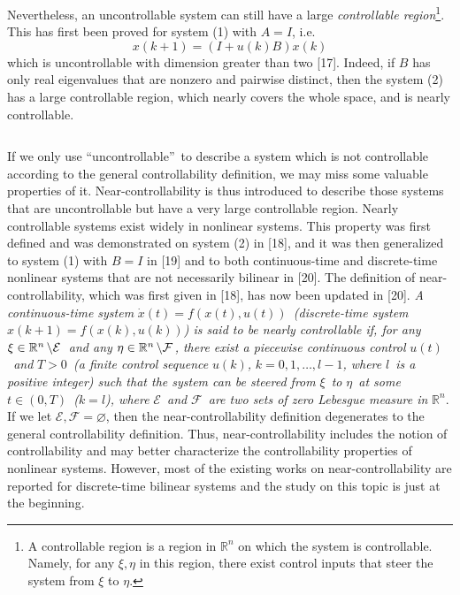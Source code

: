 \documentclass[journal,a4paper,12pt,onecolumn]{IEEEtran}
\begin{document}
Nevertheless, an uncontrollable system can still have a large \textit{controllable region}\footnote{A controllable region is a region in $\mathbb{R}
^{n}$ on which the system is controllable. Namely, for any $\xi ,\eta $ in
this region, there exist control inputs that steer the system from $\xi $ to
$\eta $.}. This has first been proved for system (1) with $A=I$, i.e.\begin{equation}
x\left( k+1\right) =\left( I+u\left( k\right) B\right) x\left( k\right)
\end{equation}which is uncontrollable with dimension greater than two [17]. Indeed, if $B$
has only real eigenvalues that are nonzero and pairwise distinct, then the
system (2) has a large controllable region, which nearly covers the whole
space, and is nearly controllable.

$\left. {}\right. $

If we only use \textquotedblleft uncontrollable\textquotedblright\ to
describe a system which is not controllable according to the general
controllability definition, we may miss some valuable properties of it.
Near-controllability is thus introduced to describe those systems that are
uncontrollable but have a very large controllable region. Nearly
controllable systems exist widely in nonlinear systems. This property was
first defined and was demonstrated on system (2) in [18], and it was then
generalized to system (1) with $B=I$ in [19] and to both continuous-time and
discrete-time nonlinear systems that are not necessarily bilinear in [20].
The definition of near-controllability, which was first given in [18], has
now been updated in [20]. \textit{A continuous-time system }$\dot{x}\left(
t\right) =f\left( x\left( t\right) ,u\left( t\right) \right) $\textit{\
(discrete-time system }$x\left( k+1\right) =f\left( x\left( k\right)
,u\left( k\right) \right) $\textit{) is said to be nearly controllable if,
for any }$\xi \in
\mathbb{R}
^{n}\left\backslash \mathcal{E}\right. $\textit{\ and any }$\eta \in
\mathbb{R}
^{n}\left\backslash \mathcal{F}\right. $\textit{, there exist a piecewise
continuous control }$u\left( t\right) $\textit{\ and }$T>0$\textit{\ (a
finite control sequence }$u\left( k\right) $\textit{, }$k=0,1,\ldots ,l-1$\textit{, where }$l$\textit{\ is a positive integer) such that the system
can be steered from }$\xi $\textit{\ to }$\eta $\textit{\ at some }$t\in
\left( 0,T\right) $\textit{\ (}$k=l$\textit{), where }$\mathcal{E}$\textit{\
and }$\mathcal{F}$\textit{\ are two sets of zero Lebesgue measure in }$\mathbb{R}
^{n}$. If we let $\mathcal{E},\mathcal{F}=\varnothing $, then the
near-controllability definition degenerates to the general controllability
definition. Thus, near-controllability includes the notion of
controllability and may better characterize the controllability properties
of nonlinear systems. However, most of the existing works on
near-controllability are reported for discrete-time bilinear systems and the
study on this topic is just at the beginning.
\end{document}
